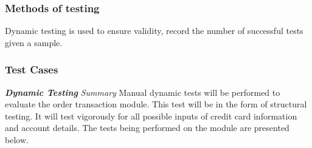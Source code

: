 \documentclass[12pt]{article}
\begin{document}

\subsubsection{Methods of testing}
Dynamic testing is used to ensure validity, record the number of successful tests given a sample.
\subsubsection{Test Cases}
\textbf{\textit{Dynamic Testing}}\newline
\newline
\textit{Summary}\newline
Manual dynamic tests will be performed to evaluate the order transaction module. This test will be in the form of structural testing. It will test vigorously for all possible inputs of credit card information and account details. The tests being performed on the module are presented below. 
\newline
\end{document}
